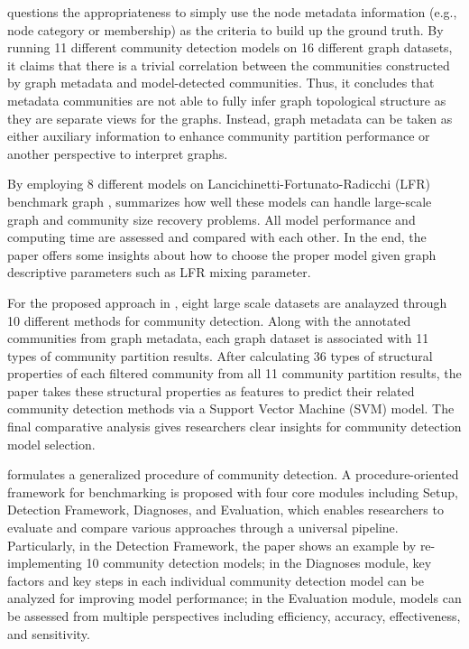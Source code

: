 \cite{hric2014community} questions the  appropriateness to simply use the node metadata information (e.g., node category or membership) as the criteria to build up the ground truth. By running 11 different community detection models on 16 different graph datasets, it claims that there is a trivial correlation between the communities constructed by graph metadata and model-detected communities. Thus, it concludes that metadata communities are not able to fully infer graph topological structure as they are separate views for the graphs. Instead, graph metadata can be taken as either auxiliary information to enhance community partition performance or another perspective to interpret graphs.  

By employing 8 different models on Lancichinetti-Fortunato-Radicchi (LFR) benchmark graph \cite{lancichinetti2008benchmark}, \cite{yang2016comparative} summarizes how well these models can handle large-scale graph and community size recovery problems. All model performance and computing time are assessed and compared with each other. In the end, the paper offers some insights about how to choose the proper model given graph descriptive parameters such as LFR mixing parameter.

 For the proposed approach in \cite{abrahao2012separability}, eight large scale datasets are analayzed through 10 different methods for community detection. Along with the annotated communities from graph metadata, each graph dataset is associated with 11 types of community partition results. After calculating 36 types of structural properties of each filtered community from all 11 community partition results, the paper takes these structural properties as features to predict their related community detection methods via a Support Vector Machine (SVM) model.  The final comparative analysis gives researchers clear insights for community detection model selection. 

\cite{wang2015community} formulates a generalized procedure of community detection. A procedure-oriented framework
for benchmarking is proposed with four core modules including Setup, Detection Framework, Diagnoses, and Evaluation, which enables researchers to evaluate and compare various approaches through a universal pipeline. Particularly, in the Detection Framework, the paper shows an example by re-implementing 10 community detection models; in the Diagnoses module, key factors and key steps in each individual community detection model can be analyzed for improving model performance; in the Evaluation module, models can be assessed from multiple perspectives including efficiency, accuracy, effectiveness, and sensitivity. 
 
